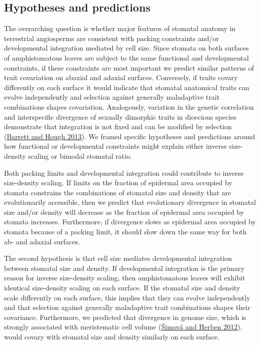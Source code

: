 \documentclass[
  12pt,
]{article}
\begin{document}
\hypertarget{hypotheses-and-predictions}{%
\subsection{Hypotheses and predictions}\label{hypotheses-and-predictions}}

The overarching question is whether major features of stomatal anatomy in terrestrial angiosperms are consistent with packing constraints and/or developmental integration mediated by cell size. Since stomata on both surfaces of amphistomatous leaves are subject to the same functional and developmental constraints, if these constraints are most important we predict similar patterns of trait covariation on abaxial and adaxial surfaces. Conversely, if traits covary differently on each surface it would indicate that stomatal anatomical traits can evolve independently and selection against generally maladaptive trait combinations shapes covariation. Analogously, variation in the genetic correlation and interspecific divergence of sexually dimorphic traits in dioecious species demonstrate that integration is not fixed and can be modified by selection (\protect\hyperlink{ref-barrett_sexual_2013}{Barrett and Hough 2013}). We framed specific hypotheses and predictions around how functional or developmental constraints might explain either inverse size-density scaling or bimodal stomatal ratio.


Both packing limits and developmental integration could contribute to inverse size-density scaling. If limits on the fraction of epidermal area occupied by stomata constrains the combinations of stomatal size and density that are evolutionarily accessible, then we predict that evolutionary divergence in stomatal size and/or density will decrease as the fraction of epidermal area occupied by stomata increases. Furthermore, if divergence slows as epidermal area occupied by stomata because of a packing limit, it should slow down the same way for both ab- and adaxial surfaces.

The second hypothesis is that cell size mediates developmental integration between stomatal size and density. If developmental integration is the primary reason for inverse size-density scaling, then amphistomatous leaves will exhibit identical size-density scaling on each surface. If the stomatal size and density scale differently on each surface, this implies that they can evolve independently and that selection against generally maladaptive trait combinations shapes their covariance. Furthermore, we predicted that divergence in genome size, which is strongly associated with meristematic cell volume (\protect\hyperlink{ref-simova_geometrical_2012}{Šímová and Herben 2012}), would covary with stomatal size and density similarly on each surface.
\end{document}
